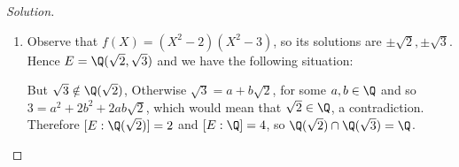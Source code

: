 \documentclass[a4paper,10pt,reqno]{amsart}
\newenvironment{sol}
  {\renewcommand\qedsymbol{$\blacksquare$}\begin{proof}[Solution]}
  {\end{proof}}
\begin{document}
\begin{sol}~
    \begin{enumerate}[label=(\roman*)]
    \item Observe that $f(X)=(X^2-2)(X^2-3)$,
    so its solutions are $\pm \sqrt{2},\pm\sqrt{3}$.
    Hence $E=\Q(\sqrt{2},\sqrt{3})$ 
    and we have the following situation:

\hspace{-2cm}
    \begin{minipage}[c]{0.57\textwidth}
    \end{minipage}
    \begin{minipage}[l]{0.4\textwidth}
        But $\sqrt{3}\notin \Q(\sqrt{2})$,
        Otherwise $\sqrt{3}=a+b\sqrt{2}$,
        for some $a,b\in\Q$ and so
        $3=a^2+2b^2+2ab\sqrt{2}$,
        which would mean that $\sqrt{2}\in\Q$,
        a contradiction.
        Therefore $[E:\Q(\sqrt{2})]=2$ and 
        $[E:\Q]=4$, so
$\Q(\sqrt{2})\cap\Q(\sqrt{3})=\Q$.
    \end{minipage}


\end{enumerate}
\end{sol}
\end{document}
